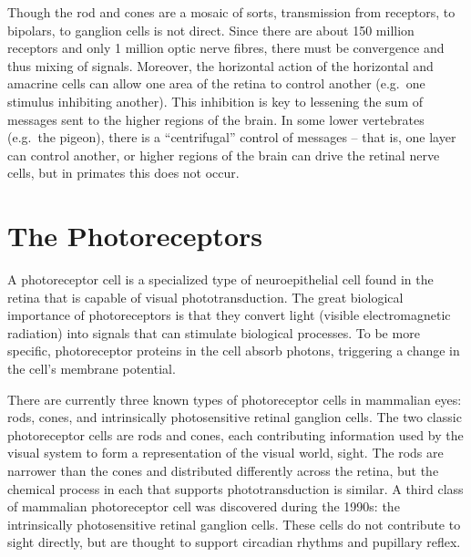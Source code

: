 Though the rod and cones are a mosaic of sorts, transmission from receptors, to bipolars, to ganglion cells is not direct. Since there are about 150 million receptors and only 1 million optic nerve fibres, there must be convergence and thus mixing of signals. Moreover, the horizontal action of the horizontal and amacrine cells can allow one area of the retina to control another (e.g.~one stimulus inhibiting another). This inhibition is key to lessening the sum of messages sent to the higher regions of the brain. In some lower vertebrates (e.g.~the pigeon), there is a ``centrifugal'' control of messages -- that is, one layer can control another, or higher regions of the brain can drive the retinal nerve cells, but in primates this does not occur.

\hypertarget{the-photoreceptors}{%
\section{The Photoreceptors}\label{the-photoreceptors}}

A photoreceptor cell is a specialized type of neuroepithelial cell found in the retina that is capable of visual phototransduction. The great biological importance of photoreceptors is that they convert light (visible electromagnetic radiation) into signals that can stimulate biological processes. To be more specific, photoreceptor proteins in the cell absorb photons, triggering a change in the cell's membrane potential.

There are currently three known types of photoreceptor cells in mammalian eyes: rods, cones, and intrinsically photosensitive retinal ganglion cells. The two classic photoreceptor cells are rods and cones, each contributing information used by the visual system to form a representation of the visual world, sight. The rods are narrower than the cones and distributed differently across the retina, but the chemical process in each that supports phototransduction is similar. A third class of mammalian photoreceptor cell was discovered during the 1990s: the intrinsically photosensitive retinal ganglion cells. These cells do not contribute to sight directly, but are thought to support circadian rhythms and pupillary reflex.



